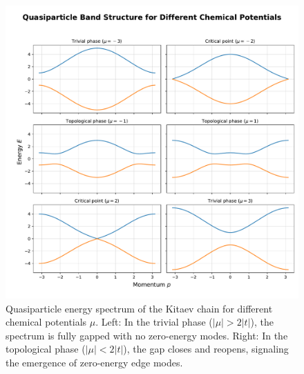 \documentclass[11pt, letterpaper, titlepage]{article}
\begin{document}
\begin{figure}
  \includegraphics[width=1\textwidth]{../Figures/band_structure.pdf}
  \caption{Quasiparticle energy spectrum of the Kitaev chain for different chemical potentials $μ$. Left: In the trivial phase ($|μ| > 2|t|$), the spectrum is fully gapped with no zero-energy modes. Right: In the topological phase ($|μ| < 2|t|$), the gap closes and reopens, signaling the emergence of zero-energy edge modes.}
\end{figure}
\newpage
\end{document}
